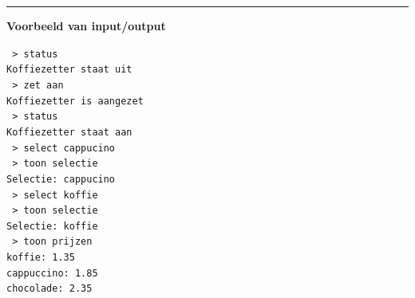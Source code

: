 \documentclass[11pt,letterpaper]{article}
\begin{document}
	\rule{\linewidth}{0.1mm}

	\textbf{Voorbeeld van input/output}
	
	\bigskip
	
\texttt{
> status \\
\indent \indent Koffiezetter staat uit \\
\indent $ $ > zet aan \\
\indent \indent Koffiezetter is aangezet \\
\indent $ $ > status \\
\indent \indent Koffiezetter staat aan \\
\indent $ $ > select cappucino \\
\indent $ $ > toon selectie \\
\indent \indent Selectie: cappucino \\
\indent $ $ > select koffie \\
\indent $ $ > toon selectie \\
\indent \indent Selectie: koffie \\
\indent $ $ > toon prijzen \\
\indent \indent koffie: 1.35 \\
\indent \indent cappuccino: 1.85 \\
\indent \indent chocolade: 2.35 \\
}

	
\end{document}

